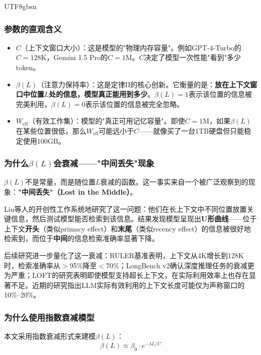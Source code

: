\documentclass[11pt,a4paper]{article}
\begin{document}
\begin{CJK*}{UTF8}{gbsn}
\subsubsection{参数的直观含义}

\begin{itemize}[nosep]
\item $C$（上下文窗口大小）：这是模型的"物理内存容量"。例如GPT-4-Turbo的$C = 128\mathrm{K}$，Gemini 1.5 Pro的$C = 1\mathrm{M}$。$C$决定了模型一次性能"看到"多少token。
\item $\beta(L)$（注意力保持率）：这是定律II的核心创新。它衡量的是：\textbf{放在上下文窗口中位置$L$处的信息，模型真正能用到多少}。$\beta(L) = 1$表示该位置的信息被完美利用，$\beta(L) = 0$表示该位置的信息被完全忽略。
\item $W_{\mathrm{eff}}$（有效工作集）：模型的"真正可用记忆容量"。即使$C = 1\mathrm{M}$，如果$\beta(L)$在某些位置很低，那么$W_{\mathrm{eff}}$可能远小于$C$——就像买了一台1TB硬盘但只能稳定使用100GB。
\end{itemize}

\subsubsection{为什么$\beta(L)$会衰减——"中间丢失"现象}

$\beta(L)$不是常量，而是随位置$L$衰减的函数。这一事实来自一个被广泛观察到的现象：\textbf{"中间丢失"（Lost in the Middle）}。

Liu等人的开创性工作系统地研究了这一问题\cite{liu2023lostmiddle}：他们在长上下文中不同位置放置关键信息，然后测试模型能否检索到该信息。结果发现模型呈现出\textbf{U形曲线}——位于上下文\textbf{开头}（类似primacy effect）和\textbf{末尾}（类似recency effect）的信息被很好地检索到，而位于\textbf{中间}的信息检索准确率显著下降。

后续研究进一步量化了这一衰减：RULER基准表明，上下文从4K增长到128K时，检索准确率从$>$95\%降至$<$70\%\cite{ruler2024}；LongBench v2确认深度推理任务的衰减更为严重\cite{longbenchv2_2024}；LOFT的研究表明即使模型支持超长上下文，在实际利用效率上也存在显著不足\cite{loft2024}。近期的研究指出LLM实际有效利用的上下文长度可能仅为声称窗口的10\%--20\%。

\subsubsection{为什么使用指数衰减模型}

本文采用指数衰减形式来建模$\beta(L)$：
\begin{equation}
\beta(L) \approx \beta_0 \cdot e^{-\lambda L / C}
\end{equation}


\end{CJK*}
\end{document}

